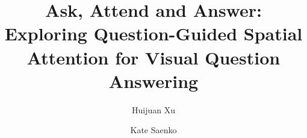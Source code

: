 \documentclass{llncs}
\begin{document}
\pagestyle{headings}
\mainmatter

\title{Ask, Attend and Answer: Exploring Question-Guided Spatial Attention for Visual Question Answering} %


\author{Huijuan Xu \and Kate Saenko}

\maketitle

















\end{document}
